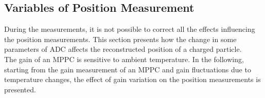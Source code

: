 \documentclass[a4paper]{article}\linespread{1.4}
\newcommand{\RNum}[1]{\uppercase\expandafter{\romannumeral #1\relax}}
\begin{document}

\clearpage
\newpage\null\thispagestyle{empty}
\subsection{Variables of Position Measurement}
\label{chap:temp}

During the measurements, it is not possible to correct all the effects influencing the position measurements. 
This section presents how the change in some parameters of ADC affects the reconstructed position of a charged particle.
\\The gain of an MPPC is sensitive to ambient temperature. In the following, starting from the gain measurement of an MPPC and gain fluctuations due to temperature changes, the effect of gain variation on the position measurements is presented.
\end{document}
